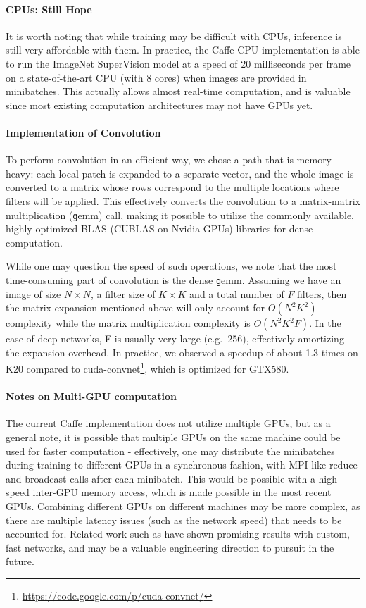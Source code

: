 \paragraph{CPUs: Still Hope} It is worth noting that while training may be difficult with CPUs, inference is still very affordable with them. In practice, the Caffe CPU implementation is able to run the ImageNet SuperVision model at a speed of 20 milliseconds per frame on a state-of-the-art CPU (with 8 cores) when images are provided in minibatches. This actually allows almost real-time computation, and is valuable since most existing computation architectures may not have GPUs yet.

\paragraph{Implementation of Convolution} To perform convolution in an efficient way, we chose a path that is memory heavy: each local patch is expanded to a separate vector, and the whole image is converted to a matrix whose rows correspond to the multiple locations where filters will be applied. This effectively converts the convolution to a matrix-matrix multiplication ({\texttt gemm}) call, making it possible to utilize the commonly available, highly optimized BLAS (CUBLAS on Nvidia GPUs) libraries for dense computation.

While one may question the speed of such operations, we note that the most time-consuming part of convolution is the dense {\texttt gemm}. Assuming we have an image of size $N\times N$, a filter size of $K\times K$ and a total number of 
$F$ filters, then the matrix expansion mentioned above will only account for $O(N^2K^2)$ complexity while the matrix multiplication complexity is $O(N^2K^2F)$. In the case of deep networks, F is usually very large (e.g.\ 256), effectively amortizing the expansion overhead. In practice, we observed a speedup of about 1.3 times on K20 compared to cuda-convnet\footnote{\url{https://code.google.com/p/cuda-convnet/}}, which is optimized for GTX580.

\paragraph{Notes on Multi-GPU computation} The current Caffe implementation does not utilize multiple GPUs, but as a general note, it is possible that multiple GPUs on the same machine could be used for faster computation - effectively, one may distribute the minibatches during training to different GPUs in a synchronous fashion, with MPI-like reduce and broadcast calls after each minibatch. This would be possible with a high-speed inter-GPU memory access, which is made possible in the most recent GPUs. Combining different GPUs on different machines may be more complex, as there are multiple latency issues (such as the network speed) that needs to be accounted for. Related work such as \cite{coates2013deep} have shown promising results with custom, fast networks, and may be a valuable engineering direction to pursuit in the future.

